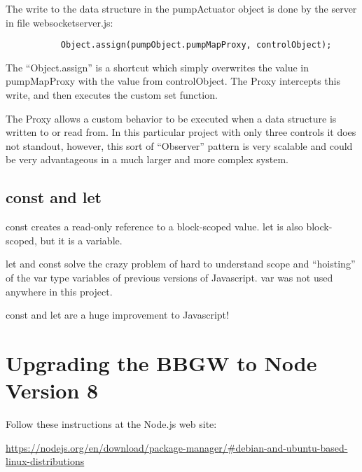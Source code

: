 The write to the data structure in the pumpActuator object is done by the 
server in file websocketserver.js:

\begin{verbatim}
           Object.assign(pumpObject.pumpMapProxy, controlObject);
\end{verbatim}

The ``Object.assign'' is a shortcut which simply overwrites the value in 
pumpMapProxy with the value from controlObject.  The Proxy intercepts this 
write, and then executes the custom set function.

The Proxy allows a custom behavior to be executed when a data structure is 
written to or read from.  In this particular project 
with only three controls it does not standout, however, this sort of 
``Observer'' pattern is very scalable and could be very advantageous in a much 
larger and more complex system.

\subsection{const and let}

const creates a read-only reference to a block-scoped value.
let is also block-scoped, but it is a variable.

let and const solve the crazy problem of hard to understand scope and 
``hoisting'' of the var type variables of previous versions of Javascript.
 var was not used anywhere in this project.
 
 const and let are a huge improvement to Javascript!
 
 \section{Upgrading the BBGW to Node Version 8}
 
 Follow these instructions at the Node.js web site:
 
 \url{https://nodejs.org/en/download/package-manager/#debian-and-ubuntu-based-linux-distributions}



